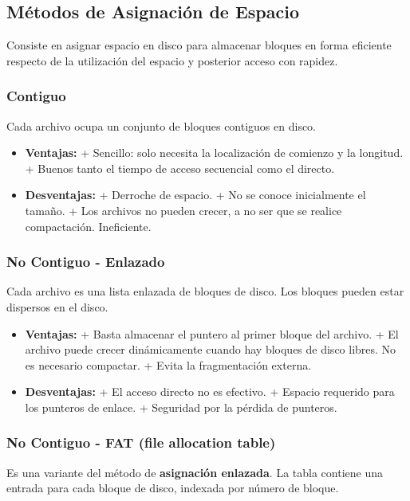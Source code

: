 \documentclass[10pt,a4paper]{article}
\begin{document}
\subsection{Métodos de Asignación de Espacio}
Consiste en asignar espacio en disco para almacenar bloques en forma eficiente respecto de la utilización del espacio y posterior acceso con rapidez.

\subsubsection{Contiguo}
Cada archivo ocupa un conjunto de bloques contiguos en disco.
\begin{itemize}
\item \textbf{Ventajas:}
\subitem + Sencillo: solo necesita la localización de comienzo y la longitud.
\subitem + Buenos tanto el tiempo de acceso secuencial como el directo.
\item \textbf{Desventajas:}
\subitem + Derroche de espacio.
\subitem + No se conoce inicialmente el tamaño.
\subitem + Los archivos no pueden crecer, a no ser que se realice compactación. Ineficiente.
\end{itemize}

\subsubsection{No Contiguo - Enlazado}
Cada archivo es una lista enlazada de bloques de disco. Los bloques pueden estar dispersos en el disco.

\begin{itemize}
\item \textbf{Ventajas:}
\subitem + Basta almacenar el puntero al primer bloque del archivo.
\subitem + El archivo puede crecer dinámicamente cuando hay bloques de disco libres. No es necesario compactar.
\subitem + Evita la fragmentación externa.

\item \textbf{Desventajas:}
\subitem + El acceso directo no es efectivo.
\subitem + Espacio requerido para los punteros de enlace.
\subitem + Seguridad por la pérdida de punteros.
\end{itemize}

\subsubsection{No Contiguo - FAT (file allocation table)}
Es una variante del método de \textbf{asignación enlazada}. La tabla contiene una entrada para cada bloque de disco, indexada por número de bloque.
\end{document}
